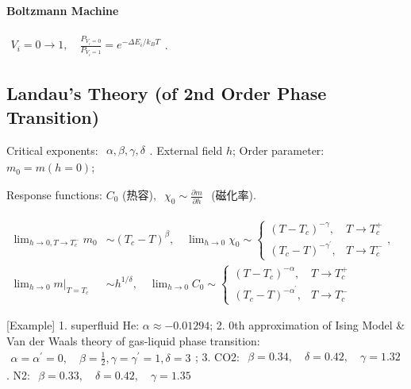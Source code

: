 \documentclass[../../main.tex]{subfiles}
\begin{document}
\paragraph{Boltzmann Machine} $\begin{aligned}
    V_{i} = 0\rightarrow 1,\quad \frac{P_{V_{i}=0}}{P_{V_{i}=1}} = e^{-\Delta E_{i}/k_{B}T}
\end{aligned}$. 

\subsection{Landau's Theory (of 2nd Order Phase Transition)}
Critical exponents: $\begin{aligned}
    \alpha,\beta,\gamma,\delta
\end{aligned}$. External field $h$; Order parameter: $m_{0} = m(h=0)$; 

Response functions: $C_{0}$ (热容), $\begin{aligned}
    \chi_{0}\sim\frac{\partial m}{\partial h}
\end{aligned}$ (磁化率). 

$\begin{aligned}
    \lim_{h\rightarrow 0,T\rightarrow T_{c}^{-}}m_{0}&\sim (T_{c}-T)^{\beta},\quad \lim_{h\rightarrow 0}\chi_{0}\sim \begin{cases}
        (T-T_{c})^{-\gamma},&T\rightarrow T_{c}^{+}\\
        (T_{c}-T)^{-\gamma^{\prime}},&T\rightarrow T_{c}^{-}
    \end{cases},\\
    \lim_{h\rightarrow 0}m\bigg|_{T=T_{c}}&\sim h^{1/\delta},\quad
    \lim_{h\rightarrow 0}C_{0}\sim \begin{cases}
        (T-T_{c})^{-\alpha}, &T\rightarrow T_{c}^{+}\\
        (T_{c}-T)^{-\alpha^{\prime}}, &T\rightarrow T_{c}^{-}
    \end{cases}
\end{aligned}$

[Example] 1. superfluid He: $\alpha \approx -0.01294$; 2. 0th approximation of Ising Model \& Van der Waals theory of gas-liquid phase transition: $\begin{aligned}
    \alpha = \alpha^{\prime} = 0, \quad \beta = \frac{1}{2}, \gamma = \gamma^{\prime} = 1,\delta = 3
\end{aligned}$; 3. CO2: $\begin{aligned}
    \beta = 0.34 ,\quad \delta = 0.42, \quad \gamma = 1.32
\end{aligned}$. N2: $\begin{aligned}
    \beta = 0.33, \quad \delta=0.42, \quad \gamma = 1.35
\end{aligned}$
\end{document}
